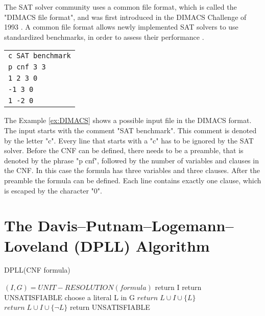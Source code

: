 The SAT solver community uses a common file format, which is called the "DIMACS file format", and was first introduced in the DIMACS Challenge of 1993 \cite{johnson1996cliques}. A common file format allows newly implemented SAT solvers to use standardized benchmarks, in order to assess their performance \cite{biere2009handbook}.

\begin{center}
\begin{leftbar}
\begin{tabular}{l}
\texttt{c SAT benchmark} \\
\texttt{p cnf 3 3} \\
\texttt{1 2 3 0} \\
\texttt{-1 3 0} \\
\texttt{1 -2 0}\\
\end{tabular}
\end{leftbar}
\label{ex:DIMACS}
\end{center}
The Example \ref{ex:DIMACS} shows a possible input file in the DIMACS format. The input starts with the comment "SAT benchmark". This comment is denoted by the letter "c". Every line that starts with a "c" has to be ignored by the SAT solver. Before the CNF can be defined, there needs to be a preamble, that is denoted by the phrase "p cnf", followed by the number of variables and clauses in the CNF. In this case the formula has three variables and three clauses. After the preamble the formula can be defined. Each line contains exactly one clause, which is escaped by the character "0". \cite{biere2009handbook}

\section{The Davis–Putnam–Logemann–Loveland (DPLL) Algorithm}
\label{sec:dpll}

\begin{algorithm}
\caption{DPLL(CNF formula) \cite{biere2009handbook}}\label{alg:DPLL}
\begin{algorithmic}
\State $(I,G) = UNIT-RESOLUTION(formula)$
	\State return I
    \State return UNSATISFIABLE
\Else
	\State choose a literal L in G
		\State $return \; L \cup I \cup \{L\}$
		\State $return \; L \cup I \cup \{\neg L\}$
	\Else
		\State return UNSATISFIABLE
	\EndIf
\EndIf
\end{algorithmic}
\end{algorithm}


